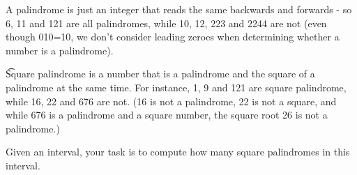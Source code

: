 A palindrome is just an integer that reads the same backwards and forwards - so 6, 11 and 121
are all palindromes, while 10, 12, 223 and 2244 are not (even though 010=10, we don't consider
leading zeroes when determining whether a number is a palindrome).

\t{Square palindrome} is a number that is a palindrome and the square of a palindrome at the same
time. For instance, 1, 9 and 121 are square palindrome, while 16, 22 and 676 are not. (16 is
not a palindrome, 22 is not a square, and while 676 is a palindrome and a square number, the
square root 26 is not a palindrome.)

Given an interval, your task is to compute how many square palindromes in this interval.
